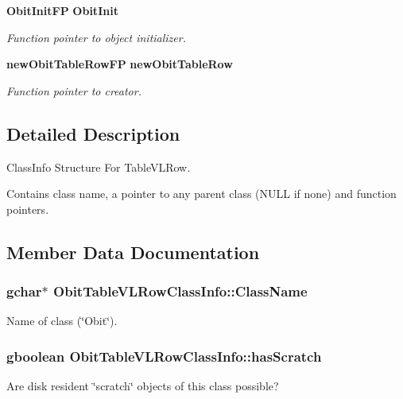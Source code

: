 \begin{CompactItemize}
{\bf Obit\-Init\-FP} {\bf Obit\-Init}
\begin{CompactList}\small\item\em Function pointer to object initializer. \item\end{CompactList}\item 
{\bf new\-Obit\-Table\-Row\-FP} {\bf new\-Obit\-Table\-Row}
\begin{CompactList}\small\item\em Function pointer to creator. \item\end{CompactList}\end{CompactItemize}


\subsection{Detailed Description}
Class\-Info Structure For Table\-VLRow. 

Contains class name, a pointer to any parent class (NULL if none) and function pointers. 



\subsection{Member Data Documentation}
\subsubsection{\setlength{\rightskip}{0pt plus 5cm}gchar$\ast$ {\bf Obit\-Table\-VLRow\-Class\-Info::Class\-Name}}\label{structObitTableVLRowClassInfo_o2}


Name of class (\char`\"{}Obit\char`\"{}). 

\subsubsection{\setlength{\rightskip}{0pt plus 5cm}gboolean {\bf Obit\-Table\-VLRow\-Class\-Info::has\-Scratch}}\label{structObitTableVLRowClassInfo_o1}


Are disk resident \char`\"{}scratch\char`\"{} objects of this class possible? 

